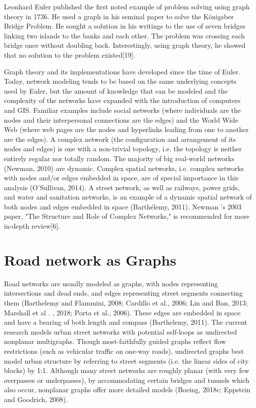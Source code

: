Leonhard Euler published the first noted example of problem solving using graph theory in 1736. He used a graph in his seminal paper to solve the Königsber Bridge Problem. He sought a solution in his writings to the use of seven bridges linking two islands to the banks and each other. The problem was crossing each bridge once without doubling back. Interestingly, using graph theory, he showed that no solution to the problem existed[19]. 

Graph theory and its implementations have developed since the time of Euler. Today, network modeling tends to be based on the same underlying concepts used by Euler, but the amount of knowledge that can be modeled and the complexity of the networks have expanded with the introduction of computers and GIS. Familiar examples include social networks (where individuals are the nodes and their interpersonal connections are the edges) and the World Wide Web (where web pages are the nodes and hyperlinks leading from one to another are the edges). A complex network (the configuration and arrangement of its nodes and edges) is one with a non-trivial topology, i.e. the topology is neither entirely regular nor totally random. The majority of big real-world networks (Newman, 2010) are dynamic. Complex spatial networks, i.e. complex networks with nodes and/or edges embedded in space, are of special importance in this analysis (O'Sullivan, 2014). A street network, as well as railways, power grids, and water and sanitation networks, is an example of a dynamic spatial network of both nodes and edges embedded in space (Barthélemy, 2011). Newman 's 2003 paper, "The Structure and Role of Complex Networks," is recommended for more in-depth review[6].

\section{Road network as Graphs}
Road networks are usually modeled as graphs, with nodes representing intersections and dead ends, and edges representing street segments connecting them (Barthelemy and Flammini, 2008; Cardillo et al., 2006; Lin and Ban, 2013; Marshall et al . , 2018; Porta et al., 2006). These edges are embedded in space and have a bearing of both length and compass (Barthelemy, 2011). The current research models urban street networks with potential  self-loops as undirected nonplanar multigraphs. Though most-faithfully guided graphs reflect flow restrictions (such as vehicular traffic on one-way roads), undirected graphs best model urban structure by referring to street segments (i.e. the linear sides of city blocks) by 1:1. Although many street networks are roughly planar (with very few overpasses or underpasses), by accommodating certain bridges and tunnels which also occur, nonplanar graphs offer more detailed models (Boeing, 2018c; Eppstein and Goodrich, 2008).

